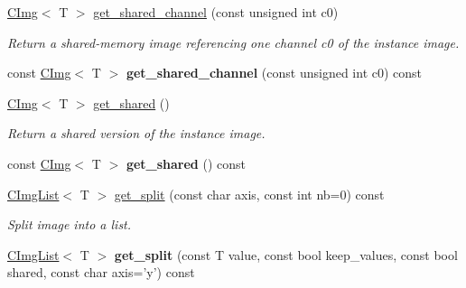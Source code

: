 \begin{DoxyCompactItemize}
\item 
\hypertarget{structcimg__library_1_1CImg_ad8f66c349cf568f9b264b65d97da4953}{
\hyperlink{structcimg__library_1_1CImg}{CImg}$<$ T $>$ \hyperlink{structcimg__library_1_1CImg_ad8f66c349cf568f9b264b65d97da4953}{get\_\-shared\_\-channel} (const unsigned int c0)}
\label{structcimg__library_1_1CImg_ad8f66c349cf568f9b264b65d97da4953}

\begin{DoxyCompactList}\small\item\em Return a shared-\/memory image referencing one channel c0 of the instance image. \item\end{DoxyCompactList}\item 
\hypertarget{structcimg__library_1_1CImg_abb55d6282717e2e7ed6a1c3bc1a81145}{
const \hyperlink{structcimg__library_1_1CImg}{CImg}$<$ T $>$ {\bfseries get\_\-shared\_\-channel} (const unsigned int c0) const }
\label{structcimg__library_1_1CImg_abb55d6282717e2e7ed6a1c3bc1a81145}

\item 
\hypertarget{structcimg__library_1_1CImg_ac9676ed1fd154d30c8a2f6f6ee17499c}{
\hyperlink{structcimg__library_1_1CImg}{CImg}$<$ T $>$ \hyperlink{structcimg__library_1_1CImg_ac9676ed1fd154d30c8a2f6f6ee17499c}{get\_\-shared} ()}
\label{structcimg__library_1_1CImg_ac9676ed1fd154d30c8a2f6f6ee17499c}

\begin{DoxyCompactList}\small\item\em Return a shared version of the instance image. \item\end{DoxyCompactList}\item 
\hypertarget{structcimg__library_1_1CImg_a3bd52fe084ef60471cddfccc1d382c4b}{
const \hyperlink{structcimg__library_1_1CImg}{CImg}$<$ T $>$ {\bfseries get\_\-shared} () const }
\label{structcimg__library_1_1CImg_a3bd52fe084ef60471cddfccc1d382c4b}

\item 
\hypertarget{structcimg__library_1_1CImg_adc2e5a953d030fca9af7af17119262a9}{
\hyperlink{structcimg__library_1_1CImgList}{CImgList}$<$ T $>$ \hyperlink{structcimg__library_1_1CImg_adc2e5a953d030fca9af7af17119262a9}{get\_\-split} (const char axis, const int nb=0) const }
\label{structcimg__library_1_1CImg_adc2e5a953d030fca9af7af17119262a9}

\begin{DoxyCompactList}\small\item\em Split image into a list. \item\end{DoxyCompactList}\item 
\hypertarget{structcimg__library_1_1CImg_aff149b1cf2670a8fefda51c0636634b9}{
\hyperlink{structcimg__library_1_1CImgList}{CImgList}$<$ T $>$ {\bfseries get\_\-split} (const T value, const bool keep\_\-values, const bool shared, const char axis='y') const }
\label{structcimg__library_1_1CImg_aff149b1cf2670a8fefda51c0636634b9}


\end{DoxyCompactItemize}

